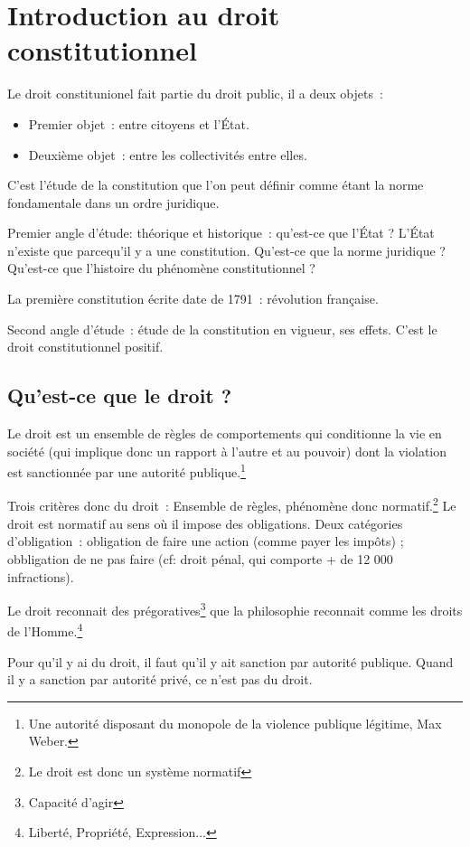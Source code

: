 \chapter{Introduction au droit constitutionnel}

Le droit constitunionel fait partie du droit public, il a deux objets~:
\begin{itemize}
\item Premier objet~: entre citoyens et l'État.
\item Deuxième objet~: entre les collectivités entre elles.
\end{itemize}
C'est l'étude de la constitution que l'on peut définir comme étant la norme fondamentale dans un ordre juridique.

Premier angle d'étude: théorique et historique~: qu'est-ce que l'État ? L'État n'existe que parcequ'il y a une constitution. Qu'est-ce que la norme juridique ? Qu'est-ce que l'histoire du phénomène constitutionnel ?

La première constitution écrite date de 1791~: révolution française.

Second angle d'étude~: étude de la constitution en vigueur, ses effets. C'est le droit constitutionnel positif.

\section{Qu'est-ce que le droit ?}

Le droit est un ensemble de règles de comportements qui conditionne la vie en société (qui implique donc un rapport à l'autre et au pouvoir) dont la violation est sanctionnée par une autorité publique.\footnote{Une autorité disposant du monopole de la violence publique légitime, Max Weber.}

Trois critères donc du droit~:
Ensemble de règles, phénomène donc normatif.\footnote{Le droit est donc un système normatif} Le droit est normatif au sens où il impose des obligations. Deux catégories d'obligation~: obligation de faire une action (comme payer les impôts) ; obbligation de ne pas faire (cf: droit pénal, qui comporte + de 12 000 infractions).

Le droit reconnait des prégoratives\footnote{Capacité d'agir} que la philosophie reconnait comme les droits de l'Homme.\footnote{Liberté, Propriété, Expression...}\newline

Pour qu'il y ai du droit, il faut qu'il y ait sanction par autorité publique. Quand il y a sanction par autorité privé, ce n'est pas du droit.

